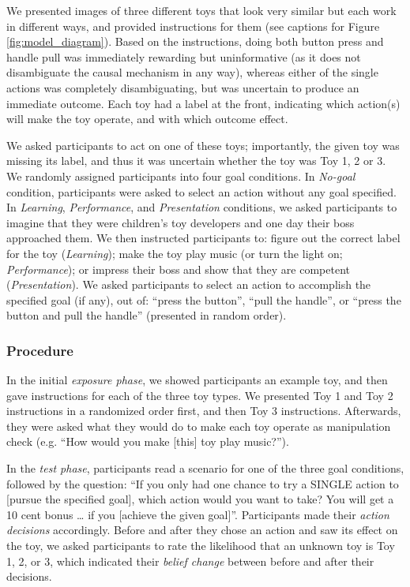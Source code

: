 \documentclass[10pt, letterpaper]{article}
\begin{document}
We presented images of three different toys that look very similar but
each work in different ways, and provided instructions for them (see
captions for Figure \ref{fig:model_diagram}). Based on the instructions,
doing both button press and handle pull was immediately rewarding but
uninformative (as it does not disambiguate the causal mechanism in any
way), whereas either of the single actions was completely
disambiguating, but was uncertain to produce an immediate outcome. Each
toy had a label at the front, indicating which action(s) will make the
toy operate, and with which outcome effect.

We asked participants to act on one of these toys; importantly, the
given toy was missing its label, and thus it was uncertain whether the
toy was Toy 1, 2 or 3. We randomly assigned participants into four goal
conditions. In \emph{No-goal} condition, participants were asked to
select an action without any goal specified. In \emph{Learning},
\emph{Performance}, and \emph{Presentation} conditions, we asked
participants to imagine that they were children's toy developers and one
day their boss approached them. We then instructed participants to:
figure out the correct label for the toy (\emph{Learning}); make the toy
play music (or turn the light on; \emph{Performance}); or impress their
boss and show that they are competent (\emph{Presentation}). We asked
participants to select an action to accomplish the specified goal (if
any), out of: ``press the button'', ``pull the handle'', or ``press the
button and pull the handle'' (presented in random order).

\subsubsection{Procedure}\label{procedure}

In the initial \emph{exposure phase}, we showed participants an example
toy, and then gave instructions for each of the three toy types. We
presented Toy 1 and Toy 2 instructions in a randomized order first, and
then Toy 3 instructions. Afterwards, they were asked what they would do
to make each toy operate as manipulation check (e.g. ``How would you
make {[}this{]} toy play music?'').

In the \emph{test phase}, participants read a scenario for one of the
three goal conditions, followed by the question: ``If you only had one
chance to try a SINGLE action to {[}pursue the specified goal{]}, which
action would you want to take? You will get a 10 cent bonus \ldots{} if
you {[}achieve the given goal{]}''. Participants made their \emph{action
decisions} accordingly. Before and after they chose an action and saw
its effect on the toy, we asked participants to rate the likelihood that
an unknown toy is Toy 1, 2, or 3, which indicated their \emph{belief
change} between before and after their decisions.
\end{document}
